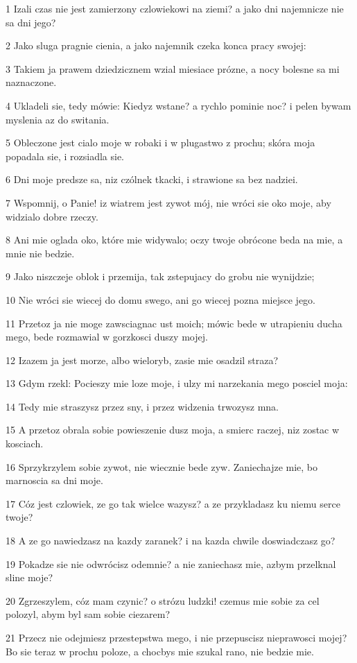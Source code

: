 \par 1 Izali czas nie jest zamierzony czlowiekowi na ziemi? a jako dni najemnicze nie sa dni jego?
\par 2 Jako sluga pragnie cienia, a jako najemnik czeka konca pracy swojej:
\par 3 Takiem ja prawem dziedzicznem wzial miesiace prózne, a nocy bolesne sa mi naznaczone.
\par 4 Ukladeli sie, tedy mówie: Kiedyz wstane? a rychlo pominie noc? i pelen bywam myslenia az do switania.
\par 5 Obleczone jest cialo moje w robaki i w plugastwo z prochu; skóra moja popadala sie, i rozsiadla sie.
\par 6 Dni moje predsze sa, niz czólnek tkacki, i strawione sa bez nadziei.
\par 7 Wspomnij, o Panie! iz wiatrem jest zywot mój, nie wróci sie oko moje, aby widzialo dobre rzeczy.
\par 8 Ani mie oglada oko, które mie widywalo; oczy twoje obrócone beda na mie, a mnie nie bedzie.
\par 9 Jako niszczeje oblok i przemija, tak zstepujacy do grobu nie wynijdzie;
\par 10 Nie wróci sie wiecej do domu swego, ani go wiecej pozna miejsce jego.
\par 11 Przetoz ja nie moge zawsciagnac ust moich; mówic bede w utrapieniu ducha mego, bede rozmawial w gorzkosci duszy mojej.
\par 12 Izazem ja jest morze, albo wieloryb, zasie mie osadzil straza?
\par 13 Gdym rzekl: Pocieszy mie loze moje, i ulzy mi narzekania mego posciel moja:
\par 14 Tedy mie straszysz przez sny, i przez widzenia trwozysz mna.
\par 15 A przetoz obrala sobie powieszenie dusz moja, a smierc raczej, niz zostac w kosciach.
\par 16 Sprzykrzylem sobie zywot, nie wiecznie bede zyw. Zaniechajze mie, bo marnoscia sa dni moje.
\par 17 Cóz jest czlowiek, ze go tak wielce wazysz? a ze przykladasz ku niemu serce twoje?
\par 18 A ze go nawiedzasz na kazdy zaranek? i na kazda chwile doswiadczasz go?
\par 19 Pokadze sie nie odwrócisz odemnie? a nie zaniechasz mie, azbym przelknal sline moje?
\par 20 Zgrzeszylem, cóz mam czynic? o strózu ludzki! czemus mie sobie za cel polozyl, abym byl sam sobie ciezarem?
\par 21 Przecz nie odejmiesz przestepstwa mego, i nie przepuscisz nieprawosci mojej? Bo sie teraz w prochu poloze, a chocbys mie szukal rano, nie bedzie mie.


